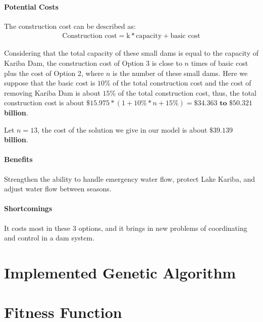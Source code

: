 \documentclass{mcmthesis}
\begin{document}
\paragraph{Potential Costs}
The construction cost can be described as:
\begin{align*}
\text{Construction cost} = \text{k}*\text{capacity} + \text{basic cost}
\end{align*}

Considering that the total capacity of these small dams is equal to the capacity of Kariba Dam, the construction cost of Option 3 is close to $n$ times of basic cost plus the cost of Option 2, where $n$ is the number of these small dams. Here we suppose that the basic cost is $10\%$ of the total construction cost and the cost of removing Kariba Dam is about $15\%$ of the total construction cost, thus, the total construction cost is about $\$15.975 * (1+10\%*n+15\%) = \mathbf{\$34.363} \textbf{ to } \mathbf{\$50.321}$ \textbf{billion}.

Let $n =13$, the cost of the solution we give in our model is about $\mathbf{\$39.139}$ \textbf{billion}.
\paragraph{Benefits}
Strengthen the ability to handle emergency water flow, protect Lake Kariba, and adjust water flow between seasons.
\paragraph{Shortcomings}
It costs most in these 3 options, and it brings in new problems of coordinating and control in a dam system.
	
	
	
	
	
\newpage

\begin{appendices}

\section{Implemented Genetic Algorithm}

\section{Fitness Function}

\end{appendices}
\end{document}
